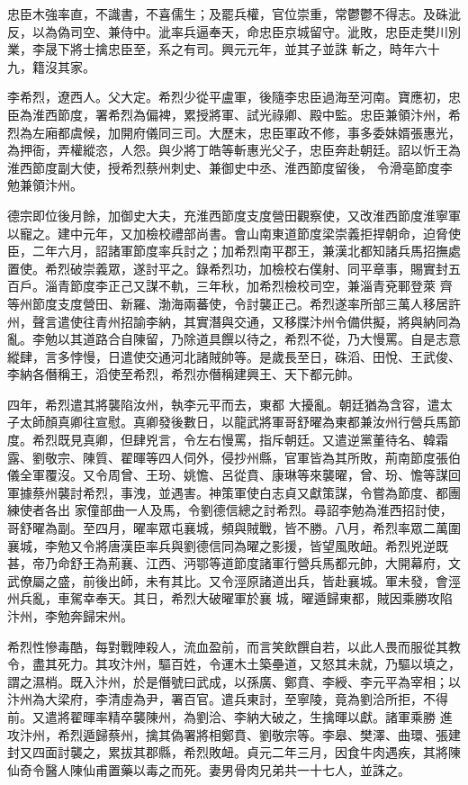 \begin{pinyinscope}
 忠臣木強率直，不識書，不喜儒生；及罷兵權，官位崇重，常鬱鬱不得志。及硃泚反，以為偽司空、兼侍中。泚率兵逼奉天，命忠臣京城留守。泚敗，忠臣走樊川別業，李晟下將士擒忠臣至，系之有司。興元元年，並其子並誅
 斬之，時年六十九，籍沒其家。



 李希烈，遼西人。父大定。希烈少從平盧軍，後隨李忠臣過海至河南。寶應初，忠臣為淮西節度，署希烈為偏裨，累授將軍、試光祿卿、殿中監。忠臣兼領汴州，希烈為左廂都虞候，加開府儀同三司。大歷末，忠臣軍政不修，事多委妹婿張惠光，為押衙，弄權縱恣，人怨。與少將丁皓等斬惠光父子，忠臣奔赴朝廷。詔以忻王為淮西節度副大使，授希烈蔡州刺史、兼御史中丞、淮西節度留後，
 令滑亳節度李勉兼領汴州。



 德宗即位後月餘，加御史大夫，充淮西節度支度營田觀察使，又改淮西節度淮寧軍以寵之。建中元年，又加檢校禮部尚書。會山南東道節度梁崇義拒捍朝命，迫脅使臣，二年六月，詔諸軍節度率兵討之；加希烈南平郡王，兼漢北都知諸兵馬招撫處置使。希烈破崇義眾，遂討平之。錄希烈功，加檢校右僕射、同平章事，賜實封五百戶。淄青節度李正己又謀不軌，三年秋，加希烈檢校司空，兼淄青兗鄆登萊
 齊等州節度支度營田、新羅、渤海兩蕃使，令討襲正己。希烈遂率所部三萬人移居許州，聲言遣使往青州招諭李納，其實潛與交通，又移牒汴州令備供擬，將與納同為亂。李勉以其道路合自陳留，乃除道具饌以待之，希烈不從，乃大慢罵。自是志意縱肆，言多悖慢，日遣使交通河北諸賊帥等。是歲長至日，硃滔、田悅、王武俊、李納各僭稱王，滔使至希烈，希烈亦僭稱建興王、天下都元帥。



 四年，希烈遣其將襲陷汝州，執李元平而去，東都
 大擾亂。朝廷猶為含容，遣太子太師顏真卿往宣慰。真卿發後數日，以龍武將軍哥舒曜為東都兼汝州行營兵馬節度。希烈既見真卿，但肆兇言，令左右慢罵，指斥朝廷。又遣逆黨董待名、韓霜露、劉敬宗、陳質、翟暉等四人伺外，侵抄州縣，官軍皆為其所敗，荊南節度張伯儀全軍覆沒。又令周曾、王玢、姚憺、呂從賁、康琳等來襲曜，曾、玢、憺等謀回軍據蔡州襲討希烈，事洩，並遇害。神策軍使白志貞又獻策謀，令嘗為節度、都團練使者各出
 家僮部曲一人及馬，令劉德信總之討希烈。尋詔李勉為淮西招討使，哥舒曜為副。至四月，曜率眾屯襄城，頻與賊戰，皆不勝。八月，希烈率眾二萬圍襄城，李勉又令將唐漢臣率兵與劉德信同為曜之影援，皆望風敗衄。希烈兇逆既甚，帝乃命舒王為荊襄、江西、沔鄂等道節度諸軍行營兵馬都元帥，大開幕府，文武僚屬之盛，前後出師，未有其比。又令涇原諸道出兵，皆赴襄城。軍未發，會涇州兵亂，車駕幸奉天。其日，希烈大破曜軍於襄
 城，曜遁歸東都，賊因乘勝攻陷汴州，李勉奔歸宋州。



 希烈性慘毒酷，每對戰陣殺人，流血盈前，而言笑飲饌自若，以此人畏而服從其教令，盡其死力。其攻汴州，驅百姓，令運木土築壘道，又怒其未就，乃驅以填之，謂之濕梢。既入汴州，於是僭號曰武成，以孫廣、鄭賁、李綬、李元平為宰相；以汴州為大梁府，李清虛為尹，署百官。遣兵東討，至寧陵，竟為劉洽所拒，不得前。又遣將翟暉率精卒襲陳州，為劉洽、李納大破之，生擒暉以獻。諸軍乘勝
 進攻汴州，希烈遁歸蔡州，擒其偽署將相鄭賁、劉敬宗等。李皋、樊澤、曲環、張建封又四面討襲之，累拔其郡縣，希烈敗衄。貞元二年三月，因食牛肉遇疾，其將陳仙奇令醫人陳仙甫置藥以毒之而死。妻男骨肉兄弟共一十七人，並誅之。




\end{pinyinscope}
